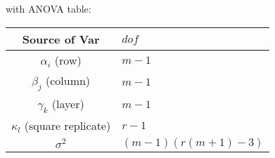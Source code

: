 \begin{itemize}[topsep=2pt,itemsep=0pt]
    with ANOVA table:
    \begin{table}[H]
        \centering
        \renewcommand\arraystretch{1.15}
        \begin{tabular}{cl}
            \hline
            Source of Var&$ dof $\\
            \hline
            $ \alpha _i $ (row)& $ m-1 $\\
            $ \beta _j $ (column) & $ m-1 $\\
            $ \gamma _k $ (layer) & $ m-1 $\\
            $ \kappa _l $ (square replicate) & $ r-1 $\\
            $ \sigma ^2 $& $ (m-1)(r(m+1)-3) $\\
            \hline
        \end{tabular}
    \end{table}


\end{itemize}
